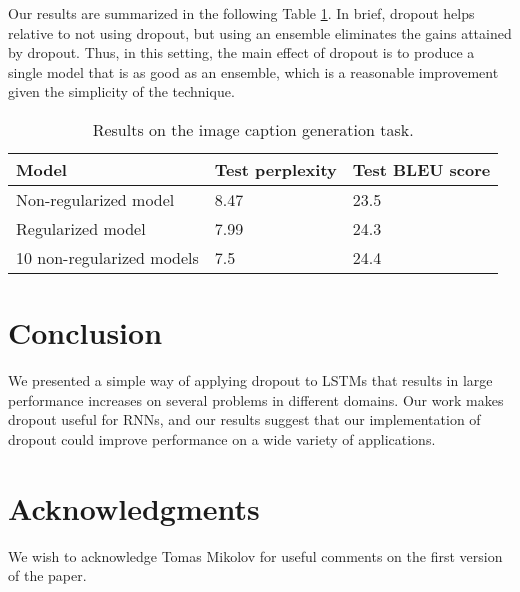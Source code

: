 \documentclass{article} %
\begin{document}
Our results are summarized in the following Table \ref{tab:vis}.  In brief,
dropout helps relative to not using dropout, but using an ensemble
eliminates the gains attained by dropout.  Thus, in this setting,
the main effect of dropout is to produce a single model that is as
good as an ensemble, which is a reasonable improvement given
the simplicity of the technique.  
\begin{table}[t]
  \small
  \centering
  \renewcommand{\arraystretch}{1.15}
  \begin{tabular}{lll}
    \hline
     Model & Test perplexity & Test BLEU score \\
    \hline
    Non-regularized model & 8.47 & 23.5 \\
    Regularized model & 7.99 &  24.3 \\
    \hline
    10 non-regularized models  & 7.5  &  24.4 \\
    \hline
  \end{tabular}
  \caption{Results on the image caption generation task. }
  \label{tab:vis}
\end{table}



\section{Conclusion}

We presented a simple way of applying dropout to LSTMs that results in
large performance increases on several problems in different domains.
Our work makes dropout useful for RNNs, and our results suggest that
our implementation of dropout could improve performance on a wide
variety of applications.

\section{Acknowledgments}

We wish to acknowledge Tomas Mikolov for useful comments on the first version of the paper.   

\small


\end{document}
